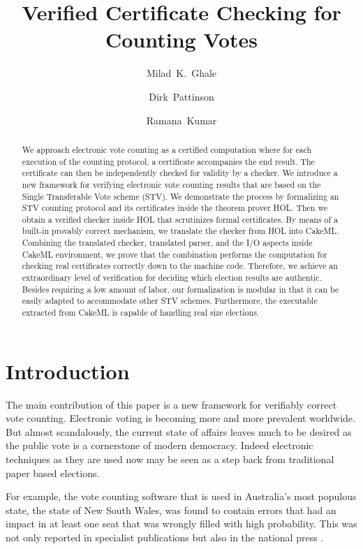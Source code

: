 \documentclass{llncs}
\begin{document}
\title{Verified Certificate Checking for Counting Votes}
\author{
Milad~K.~Ghale\and
Dirk~Pattinson\and
Ramana~Kumar}
\maketitle
\begin{abstract}
We approach electronic vote counting as a certified computation where for each execution of the counting protocol, a certificate accompanies the end result. The certificate can then be independently checked for validity by a checker. We introduce a new framework for verifying electronic vote counting results that are based on the Single Transferable Vote scheme (STV). We demonstrate the process by formalizing an STV counting protocol and its certificates inside the theorem prover HOL. Then we obtain a verified checker inside HOL that scrutinizes formal certificates. By means of a built-in provably correct mechanism, we translate the checker from HOL into CakeML. Combining the translated checker, translated parser, and the I/O aspects inside CakeML environment, we prove that the combination performs the computation for checking real certificates correctly down to the machine code. Therefore, we achieve an extraordinary level of verification for deciding which election results are authentic. Besides requiring a low amount of labor, our formalization is modular in that it can be easily adapted to accommodate other STV schemes. Furthermore, the executable extracted from CakeML is capable of handling real size elections.

\end{abstract}
\section{Introduction}\label{sec:intro}

The main contribution of this paper is a new framework for
verifiably correct vote counting. 
%
Electronic voting is becoming more and more prevalent worldwide. 
But almost scandalously, 
the current state of affairs leaves much
to be
desired as the public vote is a cornerstone of
modern democracy.
Indeed electronic techniques as they are used now may be seen as a step back from traditional
paper based elections.

For example, the vote counting software that is used in Australia's
most populous 
state, the state of New South Wales, 
was found to contain errors that had an impact in at least one seat that
was wrongly filled with high probability.
This was not only reported in specialist publications
\cite{Conway:2017:ANS} but
also in the national press \cite{Brooks:2017:NCE}.
 
\end{document}
